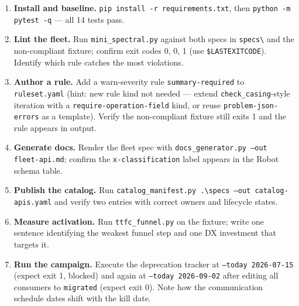 \begin{enumerate}
  \item \textbf{Install and baseline.} \texttt{pip install -r
        requirements.txt}, then \texttt{python -m pytest -q} --- all 14
        tests pass.
  \item \textbf{Lint the fleet.} Run \texttt{mini\_spectral.py} against
        both specs in \texttt{specs\textbackslash{}} and the
        non-compliant fixture; confirm exit codes 0, 0, 1 (use
        \texttt{\$LASTEXITCODE}). Identify which rule catches the most
        violations.
  \item \textbf{Author a rule.} Add a warn-severity rule
        \texttt{summary-required} to \texttt{ruleset.yaml} (hint: new rule
        kind not needed --- extend \texttt{check\_casing}-style iteration
        with a \texttt{require-operation-field} kind, or reuse
        \texttt{problem-json-errors} as a template). Verify the
        non-compliant fixture still exits 1 and the rule appears in
        output.
  \item \textbf{Generate docs.} Render the fleet spec with
        \texttt{docs\_generator.py --out fleet-api.md}; confirm the
        \texttt{x-classification} label appears in the Robot schema
        table.
  \item \textbf{Publish the catalog.} Run
        \texttt{catalog\_manifest.py .\textbackslash{}specs --out catalog-apis.yaml}
        and verify two entries with correct owners and lifecycle states.
  \item \textbf{Measure activation.} Run \texttt{ttfc\_funnel.py} on the
        fixture; write one sentence identifying the weakest funnel step
        and one DX investment that targets it.
  \item \textbf{Run the campaign.} Execute the deprecation tracker at
        \texttt{--today 2026-07-15} (expect exit 1, blocked) and again at
        \texttt{--today 2026-09-02} after editing all consumers to
        \texttt{migrated} (expect exit 0). Note how the communication
        schedule dates shift with the kill date.
\end{enumerate}

